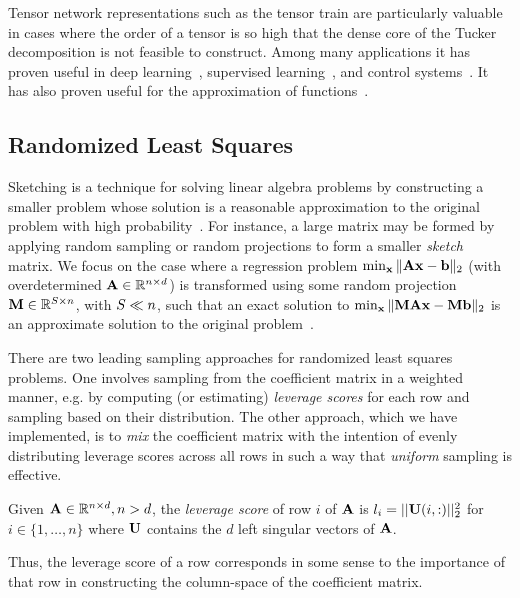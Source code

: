Tensor network representations such as the tensor train are particularly valuable in cases where the order of a tensor is so high that the dense core of the Tucker decomposition is not feasible to construct. Among many applications it has proven useful in deep learning~\cite{ttrnn,ttnn}, supervised learning~\cite{supervisedtt}, and control systems~\cite{ttcontrol}. It has also proven useful for the approximation of functions~\cite{GoKaMa15}.

\subsection{Randomized Least Squares}
\label{sec:sketching}
Sketching is a technique for solving linear algebra problems by constructing 
a smaller problem whose solution is a 
reasonable approximation to the original problem with high probability~\cite{sketching}. 
For instance, a large matrix may be formed by applying random sampling or random 
projections to form a smaller \emph{sketch} matrix. 
We focus on the case where a regression
problem $\min_{\V{x}}\| \M{A}\V{x} - \V{b} \|_2$ (with overdetermined
$\M{A} \in \mathbb{R}^{n\times d}$) is transformed using some random
projection $\M{M} \in \mathbb{R}^{\samplesize\times n}$, with $S\ll
n$, such that an exact solution to $\min_{\V{x}}\| \M{M}\M{A}\V{x} -
\M{M}\V{b} \|_2$ is an approximate solution to the original
problem~\cite{rokhlintygert,DrMaMuSa11,blendenpik}.


There are two leading sampling approaches for randomized least squares
problems. One involves sampling from the coefficient matrix in a
weighted manner, e.g. by computing (or estimating) \emph{leverage
  scores} for each row and sampling based on their distribution. The
other approach, which we have implemented, is to \emph{mix} the
coefficient matrix with the intention of evenly distributing leverage scores
across all rows in such a way that \emph{uniform} sampling is
effective. 
\begin{definition}
Given $\M{A} \in \mathbb{R}^{n\times d}, n > d$, the \emph{leverage score} of row $i$ of $\M{A}$ is $l_i = ||\M{U}(i,:)||_2^2$
for $i \in \{1,\dots ,n\}$ where $\M{U}$ contains the $d$ left singular vectors of $\M{A}$.
\end{definition}
Thus, the leverage score of a row corresponds in some sense to the
importance of that row in constructing the column-space of the
coefficient matrix. 

